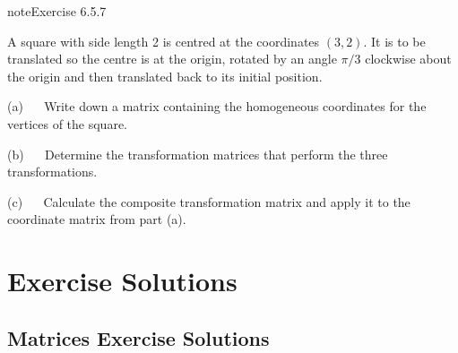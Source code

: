 \documentclass[letterpaper,10pt,english]{jupyterBook}
\begin{document}
\begin{sphinxadmonition}{note}{Exercise 6.5.7}



\sphinxAtStartPar
A square with side length 2 is centred at the co\sphinxhyphen{}ordinates \((3, 2)\). It is to be translated so the centre is at the origin, rotated by an angle \(\pi/3\) clockwise about the origin and then translated back to its initial position.

\sphinxAtStartPar
(a)   Write down a matrix containing the homogeneous co\sphinxhyphen{}ordinates for the vertices of the square.

\sphinxAtStartPar
(b)   Determine the transformation matrices that perform the three transformations.

\sphinxAtStartPar
(c)   Calculate the composite transformation matrix and apply it to the co\sphinxhyphen{}ordinate matrix from part (a).
\end{sphinxadmonition}

\sphinxstepscope


\part{Exercise Solutions}

\sphinxstepscope


\chapter{Matrices Exercise Solutions}
\label{\detokenize{_pages/A1_Matrices_exercises_solutions:matrices-exercise-solutions}}\label{\detokenize{_pages/A1_Matrices_exercises_solutions:matrices-exercises-solutions}}\label{\detokenize{_pages/A1_Matrices_exercises_solutions::doc}} \label{_pages/A1_Matrices_exercises_solutions:_pages/A1_Matrices_exercises_solutions-solution-0}
\end{document}

